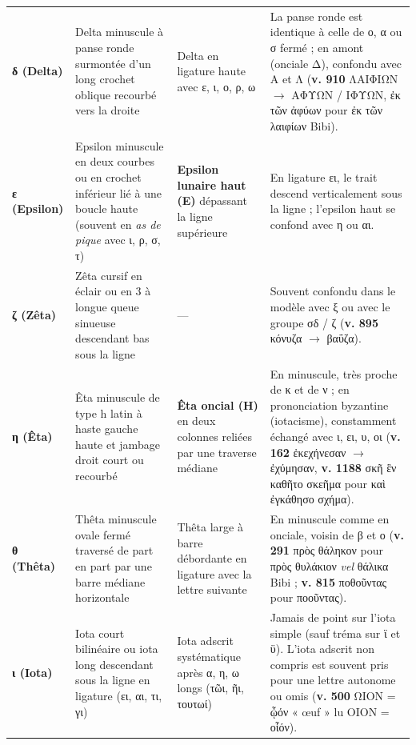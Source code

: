 \documentclass[11pt, a4paper, twoside]{article}
\renewcommand{\_}{\origunderscore\penalty0\relax}
\renewcommand{\texttt}[1]{#1}
\newcommand{\Bibi}{\textit{Bibi}}
\def\Bibi{Bibi}%
\begin{document}
{\begin{longtable}{@{}>{\raggedright\arraybackslash}p{} >{\raggedright\arraybackslash}p{} >{\raggedright\arraybackslash}p{} >{\raggedright\arraybackslash}p{}@{}}
\addlinespace[3pt]
\textbf{δ (Delta)} & Delta minuscule à panse ronde surmontée d'un long crochet oblique recourbé vers la droite & Delta en ligature haute avec ε, ι, ο, ρ, ω & La panse ronde est identique à celle de ο, α ou σ fermé ; en amont (onciale \texttt{Δ}), confondu avec \texttt{Α} et \texttt{Λ} (\textbf{v. 910} \texttt{ΛΑΙΦΙΩΝ} $\to$ \texttt{ΑΦΥΩΝ} / \texttt{ΙΦΥΩΝ}, \texttt{ἐκ τῶν ἀφύων} pour \texttt{ἐκ τῶν λαιφίων} \Bibi{}). \\
\addlinespace[3pt]
\textbf{ε (Epsilon)} & Epsilon minuscule en deux courbes ou en crochet inférieur lié à une boucle haute (souvent en \textit{as de pique} avec ι, ρ, σ, τ) & \textbf{Epsilon lunaire haut (\texttt{Ε})} dépassant la ligne supérieure & En ligature ει, le trait descend verticalement sous la ligne ; l'epsilon haut se confond avec η ou αι. \\
\addlinespace[3pt]
\textbf{ζ (Zêta)} & Zêta cursif en éclair ou en \texttt{3} à longue queue sinueuse descendant bas sous la ligne & — & Souvent confondu dans le modèle avec ξ ou avec le groupe σδ / ζ (\textbf{v. 895} \texttt{κόνυζα} $\to$ \texttt{βαΰζα}). \\
\addlinespace[3pt]
\textbf{η (Êta)} & Êta minuscule de type \texttt{h} latin à haste gauche haute et jambage droit court ou recourbé & \textbf{Êta oncial (\texttt{Η})} en deux colonnes reliées par une traverse médiane & En minuscule, très proche de κ et de ν ; en prononciation byzantine (iotacisme), constamment échangé avec ι, ει, υ, οι (\textbf{v. 162} \texttt{ἐκεχήνεσαν} $\to$ \texttt{ἐχύμησαν}, \textbf{v. 1188} \texttt{σκῆ ἓν καθῆτο σκεῆμα} pour \texttt{καὶ ἐγκάθησο σχήμα}). \\
\addlinespace[3pt]
\textbf{θ (Thêta)} & Thêta minuscule ovale fermé traversé de part en part par une barre médiane horizontale & Thêta large à barre débordante en ligature avec la lettre suivante & En minuscule comme en onciale, voisin de β et ο (\textbf{v. 291} \texttt{πρὸς θάληκον} pour \texttt{πρὸς θυλάκιον} \textit{vel} \texttt{θάλικα} \Bibi{} ; \textbf{v. 815} \texttt{ποθοῦντας} pour \texttt{ποοῦντας}). \\
\addlinespace[3pt]
\textbf{ι (Iota)} & Iota court bilinéaire ou iota long descendant sous la ligne en ligature (ει, αι, τι, γι) & Iota adscrit systématique après α, η, ω longs (\texttt{τῶι}, \texttt{ῆι}, \texttt{τουτωί}) & Jamais de point sur l'iota simple (sauf tréma sur ϊ et ϋ). L'iota adscrit non compris est souvent pris pour une lettre autonome ou omis (\textbf{v. 500} \texttt{ΩΙΟΝ} = \texttt{ᾦόν} « œuf » lu \texttt{ΟΙΟΝ} = \texttt{οἷόν}). \\

\end{longtable}}
\end{document}
